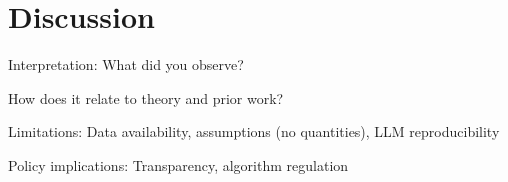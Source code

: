 \section{Discussion}

Interpretation: What did you observe?

How does it relate to theory and prior work?

Limitations: Data availability, assumptions (no quantities), LLM reproducibility

Policy implications: Transparency, algorithm regulation

